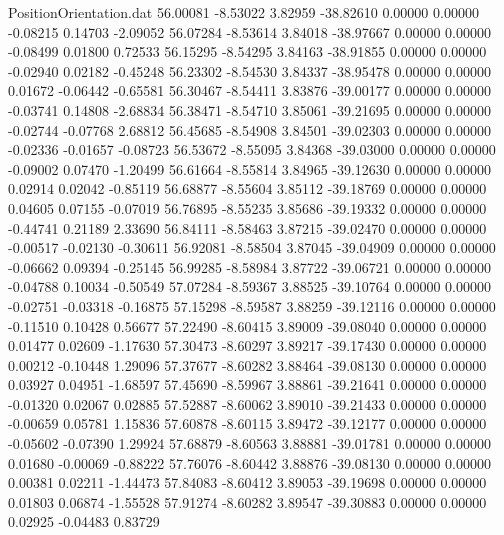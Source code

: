 \begin{filecontents}{PositionOrientation.dat}
  56.00081   -8.53022    3.82959   -38.82610    0.00000    0.00000   -0.08215    0.14703   -2.09052
  56.07284   -8.53614    3.84018   -38.97667    0.00000    0.00000   -0.08499    0.01800    0.72533
  56.15295   -8.54295    3.84163   -38.91855    0.00000    0.00000   -0.02940    0.02182   -0.45248
  56.23302   -8.54530    3.84337   -38.95478    0.00000    0.00000    0.01672   -0.06442   -0.65581
  56.30467   -8.54411    3.83876   -39.00177    0.00000    0.00000   -0.03741    0.14808   -2.68834
  56.38471   -8.54710    3.85061   -39.21695    0.00000    0.00000   -0.02744   -0.07768    2.68812
  56.45685   -8.54908    3.84501   -39.02303    0.00000    0.00000   -0.02336   -0.01657   -0.08723
  56.53672   -8.55095    3.84368   -39.03000    0.00000    0.00000   -0.09002    0.07470   -1.20499
  56.61664   -8.55814    3.84965   -39.12630    0.00000    0.00000    0.02914    0.02042   -0.85119
  56.68877   -8.55604    3.85112   -39.18769    0.00000    0.00000    0.04605    0.07155   -0.07019
  56.76895   -8.55235    3.85686   -39.19332    0.00000    0.00000   -0.44741    0.21189    2.33690
  56.84111   -8.58463    3.87215   -39.02470    0.00000    0.00000   -0.00517   -0.02130   -0.30611
  56.92081   -8.58504    3.87045   -39.04909    0.00000    0.00000   -0.06662    0.09394   -0.25145
  56.99285   -8.58984    3.87722   -39.06721    0.00000    0.00000   -0.04788    0.10034   -0.50549
  57.07284   -8.59367    3.88525   -39.10764    0.00000    0.00000   -0.02751   -0.03318   -0.16875
  57.15298   -8.59587    3.88259   -39.12116    0.00000    0.00000   -0.11510    0.10428    0.56677
  57.22490   -8.60415    3.89009   -39.08040    0.00000    0.00000    0.01477    0.02609   -1.17630
  57.30473   -8.60297    3.89217   -39.17430    0.00000    0.00000    0.00212   -0.10448    1.29096
  57.37677   -8.60282    3.88464   -39.08130    0.00000    0.00000    0.03927    0.04951   -1.68597
  57.45690   -8.59967    3.88861   -39.21641    0.00000    0.00000   -0.01320    0.02067    0.02885
  57.52887   -8.60062    3.89010   -39.21433    0.00000    0.00000   -0.00659    0.05781    1.15836
  57.60878   -8.60115    3.89472   -39.12177    0.00000    0.00000   -0.05602   -0.07390    1.29924
  57.68879   -8.60563    3.88881   -39.01781    0.00000    0.00000    0.01680   -0.00069   -0.88222
  57.76076   -8.60442    3.88876   -39.08130    0.00000    0.00000    0.00381    0.02211   -1.44473
  57.84083   -8.60412    3.89053   -39.19698    0.00000    0.00000    0.01803    0.06874   -1.55528
  57.91274   -8.60282    3.89547   -39.30883    0.00000    0.00000    0.02925   -0.04483    0.83729

\end{filecontents}
